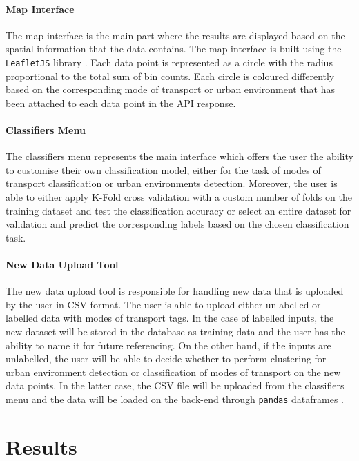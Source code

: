 \documentclass[bsc,frontabs,twoside,singlespacing,parskip,deptreport]{infthesis}     %
\begin{document}
\subsubsection*{Map Interface}

The map interface is the main part where the results are displayed based on the spatial information that the data contains.  The map interface is built using the \texttt{LeafletJS} library \cite{leaflet}. Each data point is represented as a circle with the radius proportional to the total sum of bin counts. Each circle is coloured differently based on the corresponding mode of transport or urban environment that has been attached to each data point in the API response.

\subsubsection*{Classifiers Menu}

The classifiers menu represents the main interface which offers the user the ability to customise their own classification model, either for the task of modes of transport classification or urban environments detection. Moreover, the user is able to either apply K-Fold cross validation with a custom number of folds on the training dataset and test the classification accuracy or select an entire dataset for validation and predict the corresponding labels based on the chosen classification task.

\subsubsection*{New Data Upload Tool}

The new data upload tool is responsible for handling new data that is uploaded by the user in CSV format. The user is able to upload either unlabelled or labelled data with modes of transport tags. In the case of labelled inputs, the new dataset will be stored in the database as training data and the user has the ability to name it for future referencing. On the other hand, if the inputs are unlabelled, the user will be able to decide whether to perform clustering for urban environment detection or classification of modes of transport on the new data points. In the latter case, the CSV file will be uploaded from the classifiers menu and the data will be loaded on the back-end through \texttt{pandas} dataframes \cite{pandas}.


\chapter{Results}
\end{document}
